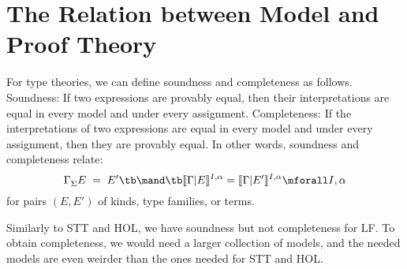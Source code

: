 \section{The Relation between Model and Proof Theory}

For type theories, we can define soundness and completeness as follows. Soundness: If two expressions are provably equal, then their interpretations are equal in every model and under every assignment. Completeness: If the interpretations of two expressions are equal in every model and under every assignment, then they are provably equal. In other words, soundness and completeness relate:
 \[\isdequal{\Sigma}{\Gamma}{E}{E'}  \tb\mand\tb \semcm{\Gamma}{E}{I,\alpha}=\semcm{\Gamma}{E'}{I,\alpha}\mforall I,\alpha\]
for pairs $(E,E')$ of kinds, type families, or terms.

Similarly to STT and HOL, we have soundness but not completeness for LF. To obtain completeness, we would need a larger collection of models, and the needed models are even weirder than the ones needed for STT and HOL.